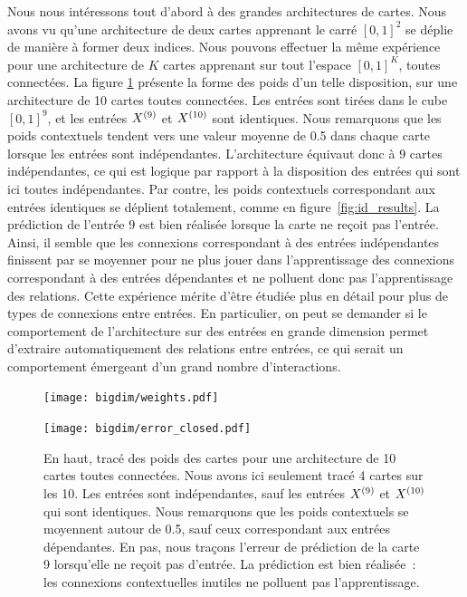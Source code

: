 \documentclass[../main]{subfiles}
\begin{document}
Nous nous intéressons tout d'abord à des grandes architectures de cartes. Nous avons vu qu'une architecture de deux cartes apprenant le carré $[0,1]^2$ se déplie de manière à former deux indices. Nous pouvons effectuer la même expérience pour une architecture de $K$ cartes apprenant sur tout l'espace $[0,1]^K$, toutes connectées.
La figure \ref{fig:bigdim} présente la forme des poids d'un telle disposition, sur une architecture de 10 cartes toutes connectées. Les entrées sont tirées dans le cube $[0,1]^9$, et les entrées $X^{({9})}$ et $X^{({10})}$ sont identiques.
Nous remarquons que les poids contextuels tendent vers une valeur moyenne de 0.5 dans chaque carte lorsque les entrées sont indépendantes. L'architecture équivaut donc à 9 cartes indépendantes, ce qui est logique par rapport à la disposition des entrées qui sont ici toutes indépendantes. Par contre, les poids contextuels correspondant aux entrées identiques se déplient totalement, comme en figure~\ref{fig:id_results}. La prédiction de l'entrée $9$ est bien réalisée lorsque la carte ne reçoit pas l'entrée. Ainsi, il semble que les connexions correspondant à des entrées indépendantes finissent par se moyenner pour ne plus jouer dans l'apprentissage des connexions correspondant à des entrées dépendantes et ne polluent donc pas l'apprentissage des relations.
Cette expérience mérite d'être étudiée plus en détail pour plus de types de connexions entre entrées. 
En particulier, on peut se demander si le comportement de l'architecture sur des entrées en grande dimension permet d'extraire automatiquement des relations entre entrées, ce qui serait un comportement émergeant d'un grand nombre d'interactions.

\begin{figure}[h!]
	\begin{minipage}{\textwidth}
	\texttt{[image: bigdim/weights.pdf]}
	\end{minipage}
\begin{minipage}{\textwidth}
	\centering\texttt{[image: bigdim/error\_closed.pdf]}
	\caption{En haut, tracé des poids des cartes pour une architecture de 10 cartes toutes connectées. Nous avons ici seulement tracé 4 cartes sur les 10. Les entrées sont indépendantes, sauf les entrées $X^{({9})}$ et $X^{({10})}$ qui sont identiques. Nous remarquons que les poids contextuels se moyennent autour de 0.5, sauf ceux correspondant aux entrées dépendantes. En pas, nous traçons l'erreur de prédiction de la carte 9 lorsqu'elle ne reçoit pas d'entrée. La prédiction est bien réalisée~: les connexions contextuelles inutiles ne polluent pas l'apprentissage. \label{fig:bigdim}}
\end{minipage}
\end{figure}
\end{document}
